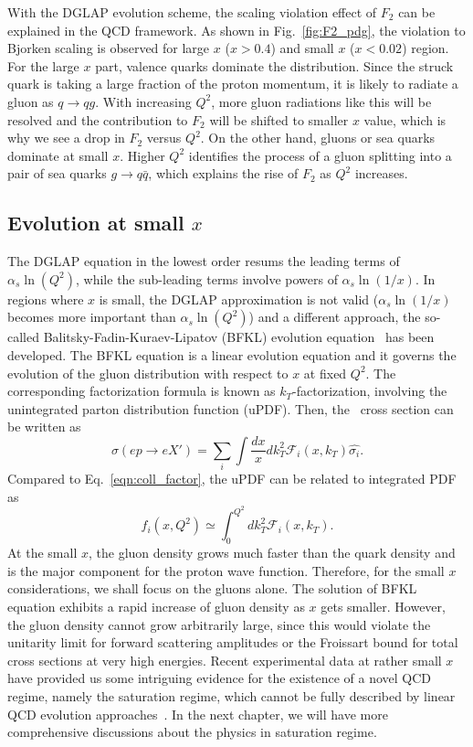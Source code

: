 With the DGLAP evolution scheme, the scaling violation effect of $F_{2}$ can be
explained in the QCD framework. As shown in Fig.~\ref{fig:F2_pdg}, the violation
to Bjorken scaling is observed for large $x$ ($x>0.4$) and small $x$ ($x<0.02$)
region. For the large $x$ part, valence quarks dominate the distribution. Since
the struck quark is taking a large fraction of the proton momentum, it is likely
to radiate a gluon as $q\rightarrow qg$. With increasing $Q^{2}$, more gluon
radiations like this will be resolved and the contribution to $F_{2}$ will be
shifted to smaller $x$ value, which is why we see a drop in $F_{2}$ versus
$Q^{2}$. On the other hand, gluons or sea quarks dominate at small $x$. Higher
$Q^{2}$ identifies the process of a gluon splitting into a pair of sea quarks
$g\rightarrow q\bar{q}$, which explains the rise of $F_{2}$ as $Q^{2}$
increases.

\subsection{Evolution at small $x$}
The DGLAP equation in the lowest order resums the leading terms of
$\alpha_{s}\ln(Q^{2})$, while the sub-leading terms involve powers of
$\alpha_{s}\ln(1/x)$. In regions where $x$ is small, the DGLAP approximation is
not valid ($\alpha_{s}\ln(1/x)$ becomes more important than
$\alpha_{s}\ln(Q^{2})$) and a different approach, the so-called
Balitsky-Fadin-Kuraev-Lipatov (BFKL) evolution equation~\cite{Balitsky:1978ic}
has been developed. The BFKL equation is a linear evolution equation and it
governs the evolution of the gluon distribution with respect to $x$ at fixed
$Q^{2}$. The corresponding factorization formula is known as
$k_{T}$-factorization, involving the unintegrated parton distribution function
(uPDF). Then, the \ep\ cross section can be written as
\begin{equation}
\sigma(ep\rightarrow eX')=\sum_{i} \int\frac{dx}{x}dk_{T}^{2}\mathcal{F}_{i}(x,k_{T})\hat{\sigma_{i}}.
\end{equation}
Compared to Eq.~\ref{eqn:coll_factor}, the uPDF can be related to integrated PDF
as \[f_{i}(x,Q^{2})\simeq \int^{Q^{2}}_{0}dk_{T}^{2}\mathcal{F}_{i}(x,k_{T}).\]
At the small $x$, the gluon density grows much faster than the quark density and
is the major component for the proton wave function. Therefore, for the small
$x$ considerations, we shall focus on the gluons alone. The solution of BFKL
equation exhibits a rapid increase of gluon density as $x$ gets smaller.
However, the gluon density cannot grow arbitrarily large, since this would
violate the unitarity limit for forward scattering amplitudes or the Froissart
bound for total cross sections at very high energies. Recent experimental data
at rather small $x$ have provided us some intriguing evidence for the existence
of a novel QCD regime, namely the saturation regime, which cannot be fully
described by linear QCD evolution
approaches~\cite{Stasto:2000er,Armesto:2004ud,Gelis:2010nm}. In the next
chapter, we will have more comprehensive discussions about the physics in
saturation regime.





